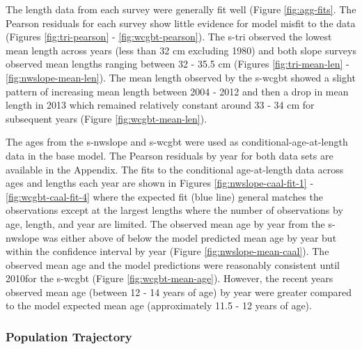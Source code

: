 \documentclass[11pt,
  english,
  a4paper,
]{article}
\begin{document}
\leavevmode\tagmcend\tagstructend\par


The length data from each survey were generally fit well (Figure \ref{fig:agg-fits}. The Pearson residuals for each survey show little evidence for model misfit to the data (Figures \ref{fig:tri-pearson} - \ref{fig:wcgbt-pearson}). The \gls{s-tri} observed the lowest mean length across years (less than 32 cm excluding 1980) and both slope surveys observed mean lengths ranging between 32 - 35.5 cm (Figures \ref{fig:tri-mean-len} - \ref{fig:nwslope-mean-len}). The mean length observed by the \gls{s-wcgbt} showed a slight pattern of increasing mean length between 2004 - 2012 and then a drop in mean length in 2013 which remained relatively constant around 33 - 34 cm for subsequent years (Figure \ref{fig:wcgbt-mean-len}).

\leavevmode\tagmcend\tagstructend\par


The ages from the \gls{s-nwslope} and \gls{s-wcgbt} were used as conditional-age-at-length data in the base model. The Pearson residuals by year for both data sets are available in the \protect\hypertarget{detailed-caal}{}{Appendix}. The fits to the conditional age-at-length data across ages and lengths each year are shown in Figures \ref{fig:nwslope-caal-fit-1} - \ref{fig:wcgbt-caal-fit-4} where the expected fit (blue line) general matches the observations except at the largest lengths where the number of observations by age, length, and year are limited. The observed mean age by year from the \gls{s-nwslope} was either above of below the model predicted mean age by year but within the confidence interval by year (Figure \ref{fig:nwslope-mean-caal}). The observed mean age and the model predictions were reasonably consistent until 2010for the \gls{s-wcgbt} (Figure \ref{fig:wcgbt-mean-age}). However, the recent years observed mean age (between 12 - 14 years of age) by year were greater compared to the model expected mean age (approximately 11.5 - 12 years of age).

\leavevmode\tagmcend\tagstructend\par


\hypertarget{population-trajectory}{%
\subsubsection{Population Trajectory}\label{population-trajectory}}
\end{document}
